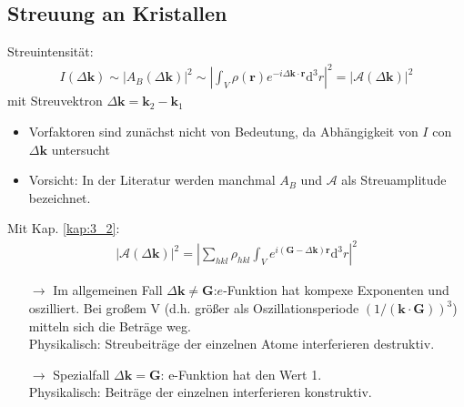 \subsection{Streuung an Kristallen} \label{kap:3_3}
Streuintensität:
\begin{align*}
    I(\Delta \textbf{k}) \sim |A_B (\Delta \textbf{k})|^2 \sim \left| \int_{V} \rho(\textbf{r})e^{-i \Delta \textbf{k} \cdot \textbf{r}} \mathrm{d}^3r\right|^2 = \left|\mathcal{A}(\Delta\textbf{k})\right|^2 
\end{align*}
mit Streuvektron $\Delta \textbf{k} = \textbf{k}_2-\textbf{k}_1$
\begin{itemize}
    \item Vorfaktoren sind zunächst nicht von Bedeutung, da Abhängigkeit von $I$ con$\Delta \textbf{k}$ untersucht
    \item Vorsicht: In der Literatur werden manchmal $A_B$ und $\mathcal{A}$ als Streuamplitude bezeichnet.
\end{itemize}
Mit Kap. \ref{kap:3_2}:
\begin{align*}
    \left| \mathcal{A} ( \Delta \textbf{k}) \right| ^2 = \left| \sum_{hkl} \rho_{hkl} \int_V e^{i(\textbf{G} - \Delta \textbf{k})\textbf{r}} \mathrm{d}^3 r \right|^2
\end{align*}

\begin{itemize}
    \item[$\rightarrow$] Im allgemeinen Fall $\Delta \textbf{k} \neq \textbf{G}$:$e$-Funktion hat kompexe Exponenten und oszilliert. Bei großem V (d.h. größer als Oszillationsperiode $\left(1 /(\textbf{k}\cdot \textbf{G})\right)^3$) mitteln sich die Beträge weg.\\
    Physikalisch: Streubeiträge der einzelnen Atome interferieren destruktiv.
    \item[$\rightarrow$] Spezialfall $\Delta \textbf{k} = \textbf{G}$: e-Funktion hat den Wert 1.\\
    Physikalisch: Beiträge der einzelnen interferieren konstruktiv.
\end{itemize}

